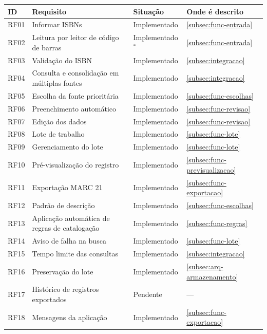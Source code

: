 \begin{quadro}[htbp]
    \centering
    \caption{Situação dos requisitos funcionais}
    \label{qua:situacao-rf}
    \footnotesize
    \begin{tabular}{|p{}|p{}|p{}|p{}|}
        \hline
        \textbf{ID} & \textbf{Requisito} & \textbf{Situação} & \textbf{Onde é descrito} \\ \hline
        RF01 & Informar ISBNs & Implementado & \autoref{subsec:func-entrada} \\ \hline
        RF02 & Leitura por leitor de código de barras & Implementado$^{*}$ & \autoref{subsec:func-entrada} \\ \hline
        RF03 & Validação do ISBN & Implementado & \autoref{subsec:integracao} \\ \hline
        RF04 & Consulta e consolidação em múltiplas fontes & Implementado & \autoref{subsec:integracao} \\ \hline
        RF05 & Escolha da fonte prioritária & Implementado & \autoref{subsec:func-escolhas} \\ \hline
        RF06 & Preenchimento automático & Implementado & \autoref{subsec:func-revisao} \\ \hline
        RF07 & Edição dos dados & Implementado & \autoref{subsec:func-revisao} \\ \hline
        RF08 & Lote de trabalho & Implementado & \autoref{subsec:func-lote} \\ \hline
        RF09 & Gerenciamento do lote & Implementado & \autoref{subsec:func-lote} \\ \hline
        RF10 & Pré-visualização do registro & Implementado & \autoref{subsec:func-previsualizacao} \\ \hline
        RF11 & Exportação MARC 21 & Implementado & \autoref{subsec:func-exportacao} \\ \hline
        RF12 & Padrão de descrição & Implementado & \autoref{subsec:func-escolhas} \\ \hline
        RF13 & Aplicação automática de regras de catalogação & Implementado & \autoref{subsec:func-regras} \\ \hline
        RF14 & Aviso de falha na busca & Implementado & \autoref{subsec:func-lote} \\ \hline
        RF15 & Tempo limite das consultas & Implementado & \autoref{subsec:integracao} \\ \hline
        RF16 & Preservação do lote & Implementado & \autoref{subsec:arq-armazenamento} \\ \hline
        RF17 & Histórico de registros exportados & Pendente & --- \\ \hline
        RF18 & Mensagens da aplicação & Implementado & \autoref{subsec:func-exportacao} \\ \hline
    \end{tabular}
\end{quadro}

